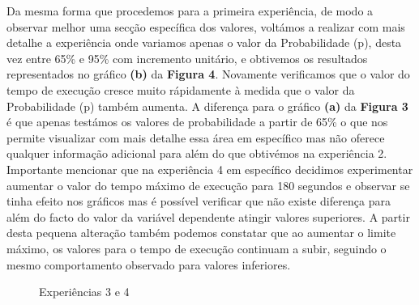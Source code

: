 \documentclass{article}
\begin{document}
Da mesma forma que procedemos para a primeira experiência, de modo a observar melhor uma secção específica dos valores, voltámos a realizar com mais detalhe a experiência onde variamos apenas o valor da Probabilidade (p), desta vez entre 65\% e 95\% com incremento unitário, e obtivemos os resultados representados no gráfico \textbf{(b)} da \textbf{Figura 4}. Novamente verificamos que o valor do tempo de execução cresce muito rápidamente à medida que o valor da Probabilidade (p) também aumenta. A diferença para o gráfico \textbf{(a)} da \textbf{Figura 3} é que apenas testámos os valores de probabilidade a partir de 65\% o que nos permite visualizar com mais detalhe essa área em específico mas não oferece qualquer informação adicional para além do que obtivémos na experiência 2. Importante mencionar que na experiência 4 em específico decidimos experimentar aumentar o valor do tempo máximo de execução para 180 segundos e observar se tinha efeito nos gráficos mas é possível verificar que não existe diferença para além do facto do valor da variável dependente atingir valores superiores. A partir desta pequena alteração também podemos constatar que ao aumentar o limite máximo, os valores para o tempo de execução continuam a subir, seguindo o mesmo comportamento observado para valores inferiores.

\begin{figure} [!htbp]
    \centering
    \qquad
    \caption{Experiências 3 e 4}%
    \label{fig:example}%
\end{figure}
\end{document}
